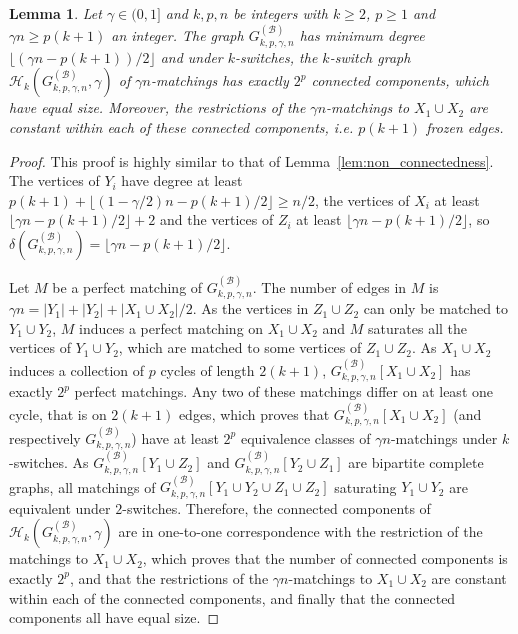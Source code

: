 \documentclass[11pt,a4paper]{article}
\newtheorem{lemma}[theorem]{Lemma}
\theoremstyle{definition}
\begin{document}
\begin{lemma}\label{lem:non_connectedness_bip}
  Let $\gamma \in (0,1]$ and $k, p, n$ be integers with $k \ge 2$, $p \ge 1$ and
  $\gamma n \ge p(k+1)$ an integer. The graph $G_{k,p,\gamma,n}^{(\mathcal{B})}$ has minimum degree
  $\lfloor (\gamma n-p(k+1))/2 \rfloor$ and under $k$-switches, the $k$-switch graph $\mathcal{H}_k(G_{k,p,\gamma,n}^{(\mathcal{B})},\gamma)$ of $\gamma n$-matchings
   has exactly $2^p$ connected components,
  which have equal size. Moreover, the restrictions of the
  $\gamma n$-matchings  to $X_1 \cup X_2$ are constant within each of these connected components, i.e. $p(k+1)$ frozen edges.
\end{lemma}

\begin{proof}
  This proof is highly similar to that of Lemma~\ref{lem:non_connectedness}. The vertices of $Y_i$ have degree at least $p(k+1)+ \lfloor(1-\gamma/2)n - p(k+1)/2\rfloor \ge n/2$, the vertices of $X_i$  at least $\lfloor \gamma n - p(k+1)/2\rfloor +2$ and the vertices of $Z_i$ at least $\lfloor \gamma n - p(k+1)/2\rfloor$, so $\delta(G_{k,p,\gamma,n}^{(\mathcal{B})}) = \lfloor \gamma n - p(k+1)/2\rfloor$.

  Let $M$ be a perfect matching of $G_{k,p,\gamma,n}^{(\mathcal{B})}$. The number of edges in $M$ is $\gamma n = |Y_1| + |Y_2| + |X_1 \cup X_2|/2$. As the vertices in $Z_1 \cup Z_2$ can only be matched to $Y_1 \cup Y_2$, $M$ induces a perfect matching on $X_1 \cup X_2$ and $M$ saturates all the vertices of $Y_1 \cup Y_2$, which are matched to some vertices of $Z_1 \cup Z_2$. As $X_1 \cup X_2$ induces a collection of $p$ cycles of length $2(k+1)$, $G_{k,p,\gamma,n}^{(\mathcal{B})}[X_1 \cup X_2]$ has exactly $2^p$ perfect matchings. Any two of these matchings differ on at least
  one cycle, that is on $2(k+1)$ edges, which proves that $G_{k,p,\gamma,n}^{(\mathcal{B})}[X_1 \cup X_2]$
  (and respectively $G_{k,p,\gamma,n}^{(\mathcal{B})}$) have at least $2^p$ equivalence classes
  of $\gamma n$-matchings under $k$-switches. As $G_{k,p,\gamma,n}^{(\mathcal{B})}[Y_1 \cup Z_2]$ and $G_{k,p,\gamma,n}^{(\mathcal{B})}[Y_2 \cup Z_1]$ are
  bipartite complete graphs, all matchings of $G_{k,p,\gamma,n}^{(\mathcal{B})}[Y_1 \cup Y_2 \cup Z_1 \cup Z_2]$ saturating $Y_1 \cup Y_2$ are
  equivalent under $2$-switches. Therefore, the connected components of $\mathcal{H}_k(G_{k,p,\gamma,n}^{(\mathcal{B})},\gamma)$ are in one-to-one
  correspondence with the restriction of the matchings to $X_1 \cup X_2$, which proves that
  the number of connected components is exactly $2^p$, and that the restrictions of the $\gamma n$-matchings to $X_1 \cup X_2$ are constant within each of the connected components, and finally that the connected components all have equal size.
\end{proof}
\end{document}
